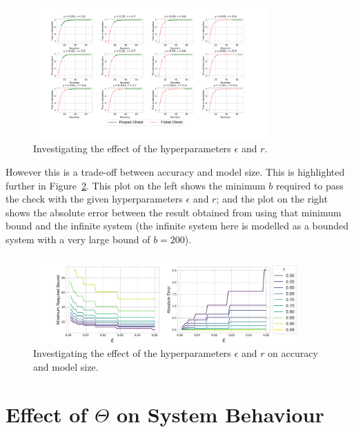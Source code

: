 \documentclass{article}
\begin{document}
\begin{figure}
  \begin{center}
    \includegraphics[width=0.8\textwidth]{img/check_hyperparameters_effect.pdf}
  \end{center}
  \caption{Investigating the effect of the hyperparameters $\epsilon$ and $r$.}
  \label{fig:investigate_hyperparameters}
\end{figure}

However this is a trade-off between accuracy and model size.
This is highlighted further in Figure~\ref{fig:summary_hyperparameters}.
This plot on the left shows the minimum $b$ required to pass the check with the
given hyperparameters $\epsilon$ and $r$; and the plot on the right shows the
absolute error between the result obtained from using that minimum bound and the
infinite system (the infinite system here is modelled as a bounded system with a
very large bound of $b = 200$).

\begin{figure}
  \begin{center}
    \includegraphics[width=0.9\textwidth]{img/check_hyperparameters_effect_summary.pdf}
  \end{center}
  \caption{Investigating the effect of the hyperparameters $\epsilon$ and $r$ on
  accuracy and model size.}
  \label{fig:summary_hyperparameters}
\end{figure}


\section{Effect of $\Theta$ on System Behaviour}



\end{document}
